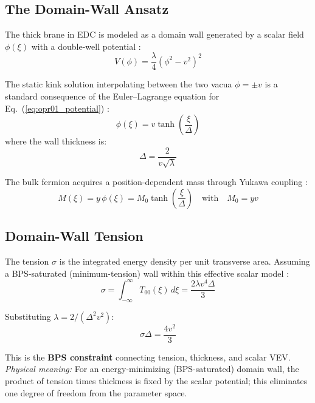 \subsection{The Domain-Wall Ansatz}

The thick brane in EDC is modeled as a domain wall generated by a scalar field
$\phi(\xi)$ with a double-well potential \tagP{}:
\begin{equation}
    V(\phi) = \frac{\lambda}{4} \left(\phi^2 - v^2\right)^2
    \label{eq:opr01_potential}
\end{equation}

The static kink solution interpolating between the two vacua $\phi = \pm v$
is a standard consequence of the Euler--Lagrange equation for
Eq.~(\ref{eq:opr01_potential}) \tagDer{}:
\begin{equation}
    \phi(\xi) = v \tanh\left(\frac{\xi}{\Delta}\right)
    \label{eq:opr01_kink}
\end{equation}
where the wall thickness is:
\begin{equation}
    \Delta = \frac{2}{v\sqrt{\lambda}}
    \label{eq:opr01_Delta}
\end{equation}

The bulk fermion acquires a position-dependent mass through Yukawa coupling \tagP{}:
\begin{equation}
    M(\xi) = y \, \phi(\xi) = M_0 \tanh\left(\frac{\xi}{\Delta}\right)
    \quad \text{with} \quad \boxed{M_0 = y v}
    \label{eq:opr01_M0}
\end{equation}

\subsection{Domain-Wall Tension}

The tension $\sigma$ is the integrated energy density per unit transverse area.
Assuming a BPS-saturated (minimum-tension) wall within this effective scalar model \tagP{}:
\begin{equation}
    \sigma = \int_{-\infty}^{\infty} T_{00}(\xi) \, d\xi = \frac{2\lambda v^4 \Delta}{3}
\end{equation}

Substituting $\lambda = 2/(\Delta^2 v^2)$:
\begin{equation}
    \boxed{\sigma \Delta = \frac{4 v^2}{3}}
    \label{eq:opr01_sigmaDelta}
\end{equation}

This is the \textbf{BPS constraint} connecting tension, thickness, and scalar VEV.
\emph{Physical meaning:} For an energy-minimizing (BPS-saturated) domain wall, the product
of tension times thickness is fixed by the scalar potential; this eliminates one degree
of freedom from the parameter space.

